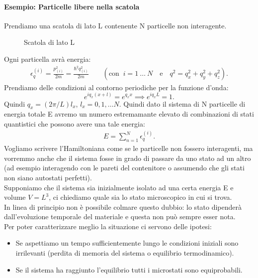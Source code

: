 \paragraph{Esempio: Particelle libere nella scatola}%
Prendiamo una scatola di lato L contenente N particelle non interagente. 
\begin{figure}[H]
    \centering
    \caption{Scatola di lato L}
    \label{fig:scatola-l3}
\end{figure}
Ogni particella avrà energia:
\begin{align}
	\epsilon^{\left(i\right)}_{q}=\frac{p_{\left(i\right)}^2}{2m}=\frac{\hbar^2q_{\left(i\right)}^2}{2m}\quad\quad\left(\text{con } \ i = 1 \ \ldots \ N
	\quad \text{e}\quad q^2 = q^2_{x}+ q^2_{y}+q^2_{z} \right)
 .\end{align}
Prendiamo delle condizioni al contorno periodiche per la funzione d'onda:
\[
	 e^{iq_{x}\left( x+l \right) } = e^{q_{x}x} \implies e^{iq_{x}L} = 1
.\] 
Quindi $q_{x} = \left( 2\pi / L \right) l_{x}$, $l_{x} = 0, 1, \ldots N$. Quindi dato il sistema di N particelle di energia totale E avremo un numero estremamante elevato di combinazioni di stati quantistici che possono avere una tale energia:
\begin{align}
	E = \sum_{n=1}^{N} \epsilon_{q}^{\left(i\right)}
.\end{align}
Vogliamo scrivere l'Hamiltoniana come se le particelle non fossero interagenti, ma vorremmo anche che il sistema fosse in grado di passare da uno stato ad un altro (ad esempio interagendo con le pareti del contenitore o assumendo che gli stati non siano autostati perfetti).\\
Supponiamo che il sistema sia inizialmente isolato ad una certa energia E e volume $V=L^3$, ci chiediamo quale sia lo stato microscopico in cui si trova.\\
In linea di principio non è possibile colmare questo dubbio: lo stato dipenderà dall'evoluzione temporale del materiale e questa non può sempre esser nota.\\
Per poter caratterizzare meglio la situazione ci servono delle ipotesi:
\begin{itemize}
	\item Se aspettiamo un tempo sufficientemente lungo le condizioni iniziali sono irrilevanti (perdita di memoria del sistema o equilibrio termodinamico).
	\item Se il sistema ha raggiunto l'equilibrio tutti i microstati sono equiprobabili.
\end{itemize}
